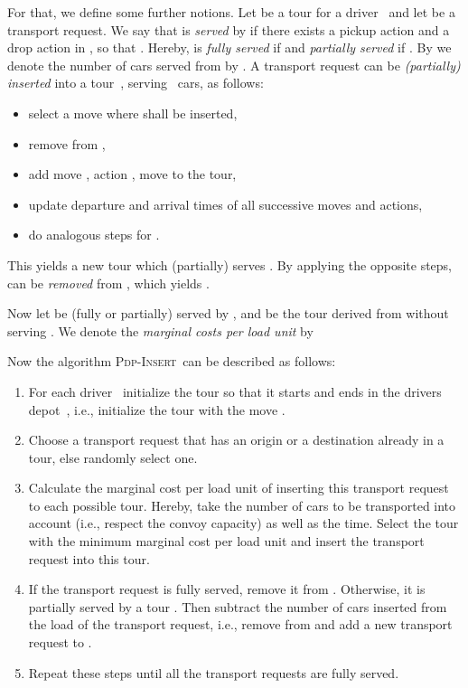 \documentclass[english]{llncs}
\numberwithin{sublemma}{lemma}
\newcommand{\PDPINSERT}{\textsc{Pdp-Insert}\xspace}
\begin{document}
For that, we define some further notions.
Let  be a tour for a driver~ and let  be a transport request.
We say that  is \emph{served} by  if there exists a pickup action  and a drop action  in ,
so that .
Hereby,  is \emph{fully served} if  and \emph{partially served} if .
By  we denote the number of cars served from  by . 
A transport request  can be \emph{(partially) inserted} into a tour~, serving~ cars, as follows:
\begin{itemize}
 \item select a move  where  shall be inserted,
 \item remove  from ,
 \item add move , action , move  to the tour,
 \item update departure and arrival times of all successive moves and actions,
 \item do analogous steps for .
\end{itemize}
This yields a new tour  which (partially) serves .
By applying the opposite steps,  can be \emph{removed} from , which yields .


Now let  be (fully or partially) served by , and  be the tour derived from  without serving .
We denote the \emph{marginal costs per load unit}  by

Now the algorithm \PDPINSERT\ can be described as follows:
\begin{enumerate}
\item For each driver~ initialize the tour so that it starts and ends in the drivers depot~, i.e., initialize the tour with the move .
\item Choose a transport request  that has an origin or a destination already in a tour, else randomly select one.
\item Calculate the marginal cost per load unit of inserting this transport request to each possible tour.
      Hereby, take the number of cars to be transported into account (i.e., respect the convoy capacity) as well as the time.
      Select the tour with the minimum marginal cost per load unit and insert the transport request into this tour.
\item If the transport request  is fully served, remove it from .
      Otherwise, it is partially served by a tour .
      Then subtract the number of cars inserted from the load of the transport request, i.e., remove  from  and add a new transport request  to .
\item Repeat these steps until all the transport requests are fully served.
\end{enumerate}
\end{document}
